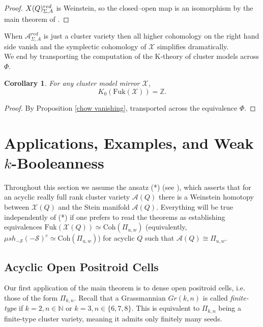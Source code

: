 \documentclass[11pt]{amsart}
\newtheorem{cor}[thm]{Corollary}
\theoremstyle{definition}
\theoremstyle{remark}
\newcommand{\A}{\mathcal{A}}
\newcommand{\X}{\mathcal{X}}
\newcommand{\Coh}{\mathrm{Coh}}
\newcommand{\Fuk}{\mathrm{Fuk}}
\numberwithin{equation}{section}
\begin{document}
\begin{proof}
    $\mathcal \X(Q)^{red}_{\Sigma,A}$ is Weinstein, so the closed–open map is an isomorphism by the main theorem of \cite{GanatraThesis}.
\end{proof}

    When $\A^{red}_{\Sigma, A}$ is just a cluster variety then all higher cohomology on the right hand side vanish and the symplectic cohomology of $\X$ simplifies dramatically.\\

    We end by transporting the computation of the K-theory of cluster models across $\Phi$.

    \begin{cor}
        For any cluster model mirror $\X$, $$K_0(\Fuk(\X)) = \mathbb{Z}.$$
    \end{cor}

    \begin{proof}
        By Proposition \ref{chow vanishing}, transported across the equivalence $\Phi$.
    \end{proof}

\section{Applications, Examples, and Weak $k$-Booleanness}\label{apps}

Throughout this section we assume the ansatz (*) (see \cite{HS}), which asserts that for an acyclic really full rank cluster variety $\mathcal{A}(Q)$ there is a Weinstein homotopy between $\X(Q)$ and the Stein manifold $\mathcal{A}(Q)$. Everything will be true independently of (*) if one prefers to read the theorems as establishing equivalences $\Fuk(\mathcal{X}(Q)) \simeq \Coh(\Pi_{u,w})$ (equivalently, $\mu sh_{-\mathcal{S}}(-\mathcal{S})^c \simeq \Coh(\Pi_{u,w})$) for acyclic $Q$ such that $\mathcal{A}(Q) \cong \Pi_{u,w}$.

\subsection{Acyclic Open Positroid Cells}

Our first application of the main theorem is to dense open positroid cells, i.e. those of the form $\Pi_{k,n}$. Recall that a Grassmannian $Gr(k,n)$ is called \textit{finite-type} if $k = 2, n \in \mathbb{N}$ or $k = 3, n \in \{6, 7, 8\}$. This is equivalent to $\Pi_{k,n}$ being a finite-type cluster variety, meaning it admits only finitely many seeds.
\end{document}
